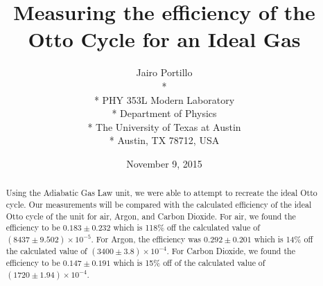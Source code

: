 \documentclass[11pt,letterpaper,onecolumn]{article}
\begin{document}

\title{\bf Measuring the efficiency of the Otto Cycle for an Ideal Gas}

\author{
 Jairo Portillo \\*
  \\*
 PHY 353L Modern Laboratory \\*
 Department of Physics \\*
 The University of Texas at Austin \\*
 Austin, TX 78712, USA
}
\date{November 9, 2015}


\maketitle


\begin{abstract}

Using the Adiabatic Gas Law unit, we were able to attempt to recreate the ideal Otto cycle. Our measurements will be compared with the calculated efficiency of the ideal Otto cycle of the unit for air, Argon, and Carbon Dioxide. For air, we found the efficiency to be $0.183\pm0.232$ which is 118\% off the calculated value of $(8437\pm9.502)\times10^{-5}$. For Argon, the efficiency was $0.292\pm0.201$ which is 14\% off the calculated value of $(3400\pm3.8)\times10^{-4}$. For Carbon Dioxide, we found the efficiency to be $0.147\pm0.191$ which is 15\% off of the calculated value of $(1720\pm1.94)\times10^{-4}$.


\end{abstract}


\end{document}
